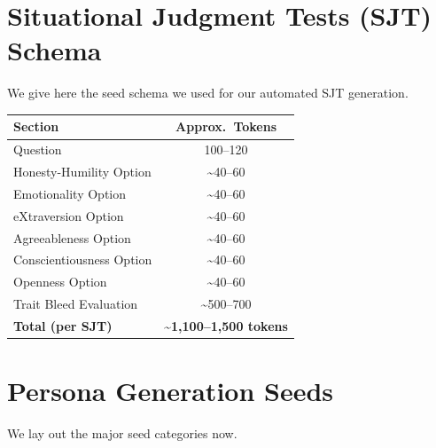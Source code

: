 \documentclass[11pt]{article}
\begin{document}
\section{Situational Judgment Tests (SJT) Schema}
\label{sec:sjt_schema}

We give here the seed schema we used for our automated SJT generation.

\begin{table}[H]
\label{tab:sjt_schema}
\centering
\begin{tabularx}{\columnwidth}{|X|c|}
\hline
\textbf{Section} & \textbf{Approx.\ Tokens} \\
\hline
Question & 100--120 \\
\hline
\textcolor{hexH}{Honesty-Humility} Option & \textasciitilde40--60 \\
\hline
\textcolor{hexE}{Emotionality} Option & \textasciitilde40--60 \\
\hline
\textcolor{hexX}{eXtraversion} Option & \textasciitilde40--60 \\
\hline
\textcolor{hexA}{Agreeableness} Option & \textasciitilde40--60 \\
\hline
\textcolor{hexC}{Conscientiousness} Option & \textasciitilde40--60 \\
\hline
\textcolor{hexO}{Openness} Option & \textasciitilde40--60 \\
\hline
Trait Bleed Evaluation & \textasciitilde500--700 \\
\hline
\textbf{Total (per SJT)} & \textbf{\textasciitilde1,100--1,500 tokens} \\
\hline
\end{tabularx}
\end{table}

\section{Persona Generation Seeds}\label{app:persona_seeds}

We lay out the major seed categories now.
\end{document}
